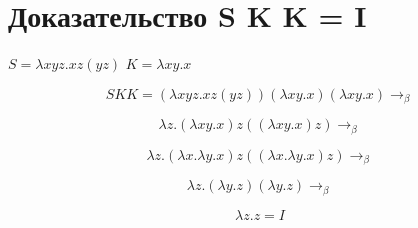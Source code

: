 \documentclass{article}
\begin{document}
\section{Доказательство S K K = I}

\Large
\newline
$S = \lambda x y z. x z (y z)$
\newline
$K = \lambda x y. x$

$$ S K K = (\lambda x y z. x z (y z)) (\lambda x y. x) (\lambda x y. x) \rightarrow_{\beta}$$ 

$$ \lambda z. (\lambda x y. x) z ((\lambda x y. x)  z) \rightarrow_{\beta}$$ 

$$ \lambda z. (\lambda x.\lambda y. x) z ((\lambda x.\lambda y. x) z) \rightarrow_{\beta}$$ 

$$ \lambda z. (\lambda y. z) (\lambda y. z) \rightarrow_{\beta}$$ 

$$ \lambda z. z = I$$ 
\end{document}
